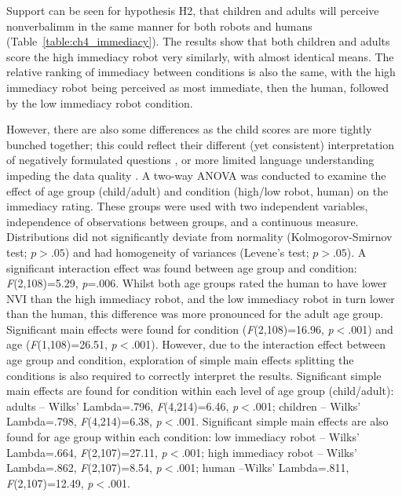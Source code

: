 Support can be seen for hypothesis H2, that children and adults will perceive \gls{nonverbalimm} in the same manner for both robots and humans (Table~\ref{table:ch4_immediacy}). The results show that both children and adults score the high immediacy robot very similarly, with almost identical means. The relative ranking of \gls{immediacy} between conditions is also the same, with the high immediacy robot being perceived as most immediate, then the human, followed by the low immediacy robot condition. 

However, there are also some differences as the child scores are more tightly bunched together; this could reflect their different (yet consistent) interpretation of negatively formulated questions \citep{borgers2004response}, or more limited language understanding impeding the data quality \citep{borgers2000children}. A two-way ANOVA was conducted to examine the effect of age group (child/adult) and condition (high/low robot, human) on the \gls{immediacy} rating. These groups were used with two independent variables, independence of observations between groups, and a continuous measure. Distributions did not significantly deviate from normality (Kolmogorov-Smirnov test; $\textit{p}>.05$) and had homogeneity of variances (Levene's test; $\textit{p}>.05$). A significant interaction effect was found between age group and condition: \textit{F}(2,108)=5.29, \textit{p}=.006. Whilst both age groups rated the human to have lower NVI than the high immediacy robot, and the low immediacy robot in turn lower than the human, this difference was more pronounced for the adult age group. Significant main effects were found for condition (\textit{F}(2,108)=16.96, \textit{p}$<$.001) and age (\textit{F}(1,108)=26.51, \textit{p}$<$.001). However, due to the interaction effect between age group and condition, exploration of simple main effects splitting the conditions is also required to correctly interpret the results. Significant simple main effects are found for condition within each level of age group (child/adult): adults -- Wilks' Lambda=.796, \textit{F}(4,214)=6.46, \textit{p}$<$.001; children -- Wilks' Lambda=.798, \textit{F}(4,214)=6.38, \textit{p}$<$.001. Significant simple main effects are also found for age group within each condition: low immediacy robot -- Wilks' Lambda=.664, \textit{F}(2,107)=27.11, \textit{p}$<$.001; high immediacy robot -- Wilks' Lambda=.862, \textit{F}(2,107)=8.54, \textit{p}$<$.001; human --Wilks' Lambda=.811, \textit{F}(2,107)=12.49, \textit{p}$<$.001.

